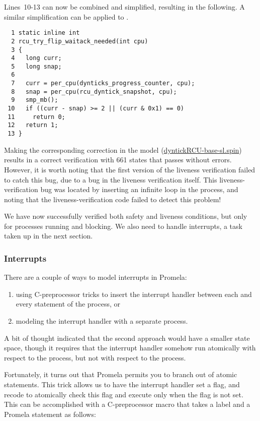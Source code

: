 Lines~10-13 can now be combined and simplified,
resulting in the following.
A similar simplification can be applied to
.

{ \scriptsize
\begin{verbatim}
  1 static inline int
  2 rcu_try_flip_waitack_needed(int cpu)
  3 {
  4   long curr;
  5   long snap;
  6
  7   curr = per_cpu(dynticks_progress_counter, cpu);
  8   snap = per_cpu(rcu_dyntick_snapshot, cpu);
  9   smp_mb();
 10   if ((curr - snap) >= 2 || (curr & 0x1) == 0)
 11     return 0;
 12   return 1;
 13 }
\end{verbatim}
}

Making the corresponding correction in the
model (\url{dyntickRCU-base-sl.spin})
results in a correct verification with 661 states that passes without
errors.
However, it is worth noting that the first version of the liveness
verification failed to catch this bug, due to a bug in the liveness
verification itself.
This liveness-verification bug was located by inserting an infinite
loop in the  process, and noting that
the liveness-verification code failed to detect this problem!

We have now successfully verified both safety and liveness
conditions, but only for processes running and blocking.
We also need to handle interrupts, a task taken up in the next section.

\subsubsection{Interrupts}
\label{app:formal:Interrupts}

There are a couple of ways to model interrupts in Promela:
\begin{enumerate}
\item	using C-preprocessor tricks to insert the interrupt handler
	between each and every statement of the 
	process, or
\item	modeling the interrupt handler with a separate process.
\end{enumerate}

A bit of thought indicated that the second approach would have a
smaller state space, though it requires that the interrupt handler
somehow run atomically with respect to the 
process, but not with respect to the 
process.

Fortunately, it turns out that Promela permits you to branch
out of atomic statements.
This trick allows us to have the interrupt handler set a flag, and
recode  to atomically check this flag
and execute only when the flag is not set.
This can be accomplished with a C-preprocessor macro that takes
a label and a Promela statement as follows:

